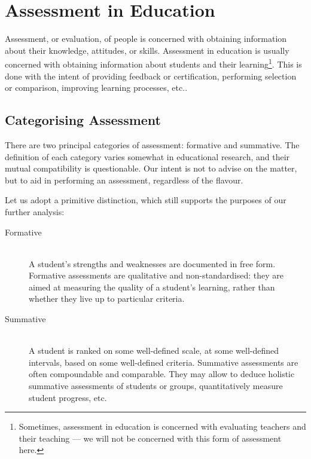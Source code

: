 
\section{Assessment in Education}

\label{section:assessment-in-education}


Assessment, or evaluation, of people is concerned with obtaining information
about their knowledge, attitudes, or skills. Assessment in education is usually
concerned with obtaining information about students and their
learning\footnote{Sometimes, assessment in education is concerned with
evaluating teachers and their teaching --- we will not be concerned with this
form of assessment here.}\cite{ramsden-1992,assessment-and-burnout}. This is
done with the intent of providing feedback or certification, performing
selection or comparison, improving learning processes,
etc.\cite{first-ten-years}.

\subsection{Categorising Assessment}

There are two principal categories of assessment: formative and summative.  The
definition of each category varies somewhat in educational
research\cite{bloom1971, sadler1989, formative-vs-summative}, and their mutual
compatibility is questionable\cite{butler1988}. Our intent is not to advise on
the matter, but to aid in performing an assessment, regardless of the flavour.

Let us adopt a primitive distinction, which still supports the purposes of our
further analysis:

\begin{description}

\item[Formative] \ \\ A student's strengths and weaknesses are documented in
free form. Formative assessments are qualitative and non-standard\-ised: they
are aimed at measuring the quality of a student's learning, rather than whether
they live up to particular criteria. 

\item[Summative] \ \\ A student is ranked on some well-defined scale, at some
well-defined intervals, based on some well-defined criteria. Summative
assessments are often compoundable and comparable. They may allow to deduce
holistic summative assessments of students or groups, quantitatively measure
student progress, etc.

\end{description}

